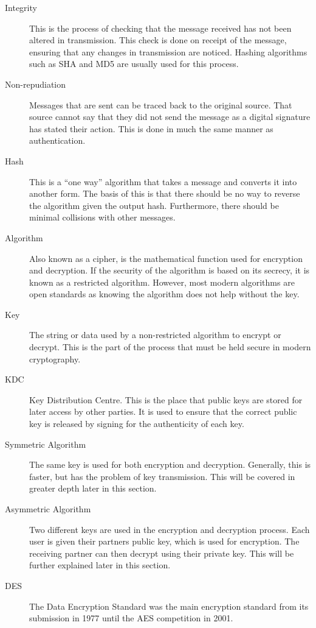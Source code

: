 \begin{description}
				\item[Integrity] 
					This is the process of checking that the message received has not been altered in transmission. 
					This check is done on receipt of the message, ensuring that any changes in transmission are noticed. 
					Hashing algorithms such as SHA and MD5 are usually used for this process. 
				\item[Non-repudiation]
					Messages that are sent can be traced back to the original source. 
					That source cannot say that they did not send the message as a digital signature has stated their action. 
					This is done in much the same manner as authentication. 
				\item[Hash]
					This is a ``one way'' algorithm that takes a message and converts it into another form. 
					The basis of this is that there should be no way to reverse the algorithm given the output hash. 
					Furthermore, there should be minimal collisions with other messages. 
				\item[Algorithm] Also known as a cipher, is the mathematical function used for encryption and decryption. 
					If the security of the algorithm is based on its secrecy, it is known as a restricted algorithm. 
					However, most modern algorithms are open standards as knowing the algorithm does not help without the key. 
				\item[Key] The string or data used by a non-restricted algorithm to encrypt or decrypt. 
					This is the part of the process that must be held secure in modern cryptography. 
				\item[KDC] Key Distribution Centre. 
					This is the place that public keys are stored for later access by other parties. 
					It is used to ensure that the correct public key is released by signing for the authenticity of each key. 
				\item[Symmetric Algorithm] The same key is used for both encryption and decryption. 
					Generally, this is faster, but has the problem of key transmission. 
					This will be covered in greater depth later in this section. 
				\item[Asymmetric Algorithm] Two different keys are used in the encryption and decryption process. 
					Each user is given their partners public key, which is used for encryption. 
					The receiving partner can then decrypt using their private key. 
					This will be further explained later in this section. 
				\item[DES] The Data Encryption Standard was the main encryption standard from its submission in 1977 until the AES competition in 2001.

\end{description}
